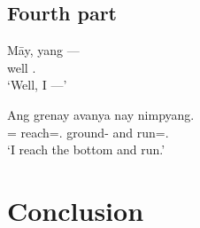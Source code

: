 \documentclass[12pt,paper=a4]{scrartcl}
\begin{document}
\subsection{Fourth part}

\begin{exe}
\ex \label{ex:4a}
	\gll Māy, yang --- \\
		well \Fsg.\Aarg{} \\
	\trans `Well, I ---'

\ex \label{ex:4b}
	\gll Ang grenay avanya nay nimpyang. \\
		\AgtT= reach=\Fsg.\Top{} ground-\Loc{} and run=\Fsg.\Aarg{} \\
	\trans `I reach the bottom and run.'
\end{exe}

\section{Conclusion}




\begingroup\multicolsep=0pt
\printglossary[
	style=threecolumn,
	type=leipzig,
]
\endgroup

\end{document}
